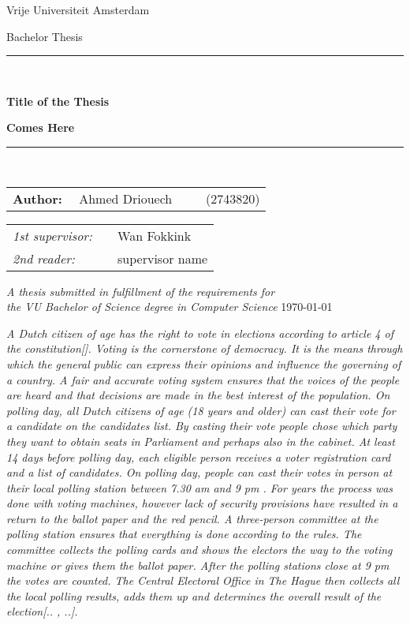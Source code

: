 \documentclass[11pt]{article}
\begin{document}
\thispagestyle{empty}
\begin{center}
Vrije Universiteit Amsterdam
\vspace{1mm}

\vspace{1.5cm}
{\Large Bachelor Thesis}
\vspace*{1.5cm}
\rule{.9\linewidth}{.6pt}\\[0.4cm]
{\huge \bfseries Title of the Thesis\par}
{\huge \bfseries Comes Here\par}\vspace{0.4cm}
\rule{.9\linewidth}{.6pt}\\[1.5cm]
\vspace*{2mm}
{\Large
\begin{tabular}{l}
{\bf Author:} ~~Ahmed Driouech ~~~~ (2743820)
\end{tabular}
}
\vspace*{1.5cm}
\begin{tabular}{ll}
{\it 1st supervisor:} & ~~Wan Fokkink \\
{\it 2nd reader:} & ~~supervisor name \\
\end{tabular}
\vspace*{2cm}
\textit{A thesis submitted in fulfillment of the requirements for\\ the VU Bachelor
of Science degree in Computer Science }
\vspace*{1cm}
\today\\[4cm] %
\end{center}
\newpage
\textit{A Dutch citizen of age has the right to vote in elections according to article 4 of the constitution[]. Voting is the cornerstone of democracy. It is the means through which the general public can express their opinions and influence the governing of a country. A fair and accurate voting system ensures that the voices of the people are heard and that decisions are made in the best interest of the population. On polling day, all Dutch citizens of age (18 years and older) can cast their vote for a candidate on the candidates list. By casting their vote people chose which party they want to obtain seats in Parliament and perhaps also in the cabinet. At least 14 days before polling day, each eligible person receives a voter registration card and a list of candidates. On polling day, people can cast their votes in person at their local polling station between 7.30 am and 9 pm . For years the process was done with voting machines, however lack of security provisions have resulted in a return to the ballot paper and the red pencil. A three-person committee at the polling station ensures that everything is done according to the rules. The committee collects the polling cards and shows the electors the way to the voting machine or gives them the ballot paper. After the polling stations close at 9 pm the votes are counted. The Central Electoral Office in The Hague then collects all the local polling results, adds them up and determines the overall result of the election[.. , ..].  }
\end{document}

